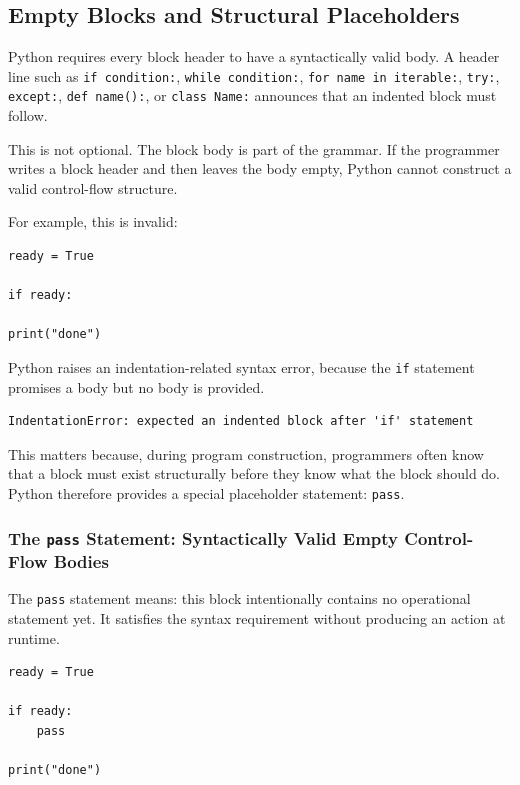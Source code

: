 \subsection{Empty Blocks and Structural Placeholders}

Python requires every block header to have a syntactically valid body. A header line such as \texttt{if condition:}, \texttt{while condition:}, \texttt{for name in iterable:}, \texttt{try:}, \texttt{except:}, \texttt{def name():}, or \texttt{class Name:} announces that an indented block must follow.

This is not optional. The block body is part of the grammar. If the programmer writes a block header and then leaves the body empty, Python cannot construct a valid control-flow structure.

For example, this is invalid:

\begin{verbatim}
ready = True

if ready:

print("done")
\end{verbatim}

Python raises an indentation-related syntax error, because the \texttt{if} statement promises a body but no body is provided.

\begin{verbatim}
IndentationError: expected an indented block after 'if' statement
\end{verbatim}

This matters because, during program construction, programmers often know that a block must exist structurally before they know what the block should do. Python therefore provides a special placeholder statement: \texttt{pass}.

\subsubsection{The \texttt{pass} Statement: Syntactically Valid Empty Control-Flow Bodies}

The \texttt{pass} statement means: this block intentionally contains no operational statement yet. It satisfies the syntax requirement without producing an action at runtime.

\begin{verbatim}
ready = True

if ready:
    pass

print("done")
\end{verbatim}

